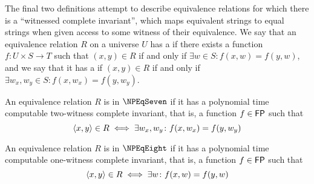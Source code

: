 The final two definitions attempt to describe equivalence relations for which there is a ``witnessed complete invariant'', which maps equivalent strings to equal strings when given access to some witness of their equivalence.
We say that an equivalence relation $R$ on a universe $U$ has a  if there exists a function $f\colon U\times S\to T$ such that $(x,y)\in R$ if and only if $\exists w\in S\colon f(x, w)=f(y, w)$, and we say that it has a  if $(x, y)\in R$ if and only if $\exists w_x, w_y\in S\colon f(x, w_x)=f(y, w_y)$.
\begin{definition}\label{def:npeq7}
  An equivalence relation $R$ is in $\NPEqSeven$ if it has a polynomial time computable two-witness complete invariant, that is, a function $f\in{\ensuremath{\mathsf{FP}}}$ such that
  \begin{displaymath}
    \left\langle x,y\right\rangle\in R\iff \exists w_x, w_y\colon f(x, w_x) = f(y, w_y)
  \end{displaymath}
\end{definition}
\begin{definition}\label{def:npeq8}
  An equivalence relation $R$ is in $\NPEqEight$ if it has a polynomial time computable one-witness complete invariant, that is, a function $f\in{\ensuremath{\mathsf{FP}}}$ such that
  \begin{displaymath}
    \left\langle x,y\right\rangle\in R\iff \exists w\colon f(x, w) = f(y, w)
  \end{displaymath}
\end{definition}

